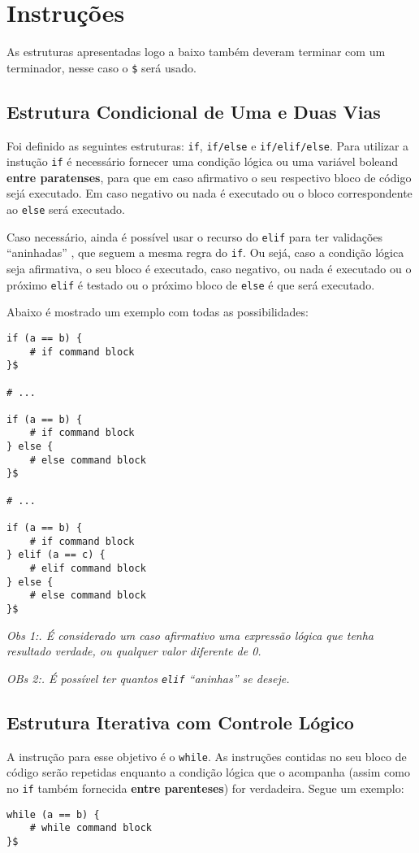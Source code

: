 \documentclass[a4paper,11pt]{article}
\begin{document}
\section{Instruções}
As estruturas apresentadas logo a baixo também deveram terminar com um terminador, nesse caso
o \texttt{\$} será usado.

\subsection{Estrutura Condicional de Uma e Duas Vias}
Foi definido as seguintes estruturas: \texttt{if}, \texttt{if/else} e \texttt{if/elif/else}.
Para utilizar a instução \texttt{if} é necessário fornecer uma condição lógica ou uma variável
boleand \textbf{entre paratenses}, para que em caso afirmativo o seu respectivo bloco de código
sejá executado. Em caso negativo ou nada é executado ou o bloco correspondente ao \texttt{else}
será executado.

Caso necessário, ainda é possível usar o recurso do \texttt{elif} para ter validações ``aninhadas''
, que seguem a mesma regra do \texttt{if}. Ou sejá, caso a condição lógica seja afirmativa, o seu
bloco é executado, caso negativo, ou nada é executado ou o próximo \texttt{elif} é testado ou
o próximo bloco de \texttt{else} é que será executado.

Abaixo é mostrado um exemplo com todas as possibilidades:
\begin{lstlisting}
if (a == b) {
    # if command block
}$

# ...

if (a == b) {
    # if command block
} else {
    # else command block
}$

# ...

if (a == b) {
    # if command block
} elif (a == c) {
    # elif command block
} else {
    # else command block
}$
\end{lstlisting}

\textit{Obs 1:. É considerado um caso afirmativo uma expressão lógica que tenha resultado verdade,
ou qualquer valor diferente de 0.}

\textit{OBs 2:. É possível ter quantos \texttt{elif} ``aninhas'' se deseje.}

\subsection{Estrutura Iterativa com Controle Lógico}
A instrução para esse objetivo é o \texttt{while}. As instruções contidas no seu bloco de código
serão repetidas enquanto a condição lógica que o acompanha (assim como no \texttt{if} também
fornecida \textbf{entre parenteses}) for verdadeira. Segue um exemplo:
\begin{lstlisting}
while (a == b) {
    # while command block
}$
\end{lstlisting}
\end{document}
